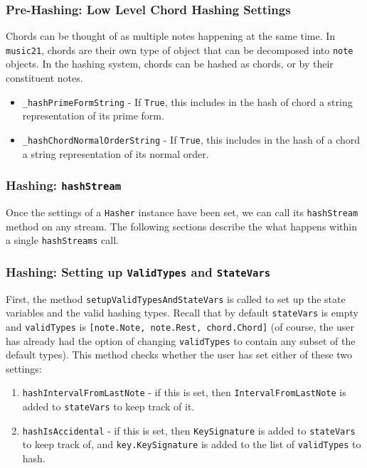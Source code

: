         \subsubsection{Pre-Hashing: Low Level Chord Hashing Settings}
        Chords can be thought of as multiple notes happening at the same time. In \texttt{music21}, chords are their own type of object that can be decomposed into \texttt{note} objects. In the hashing system, chords can be hashed as chords, or by their constituent notes.
                    \begin{itemize}
                    \item \texttt{\_hashPrimeFormString} - If \texttt{True}, this includes in the hash of chord a string representation of its prime form.
                    \item \texttt{\_hashChordNormalOrderString} - If \texttt{True}, this includes in the hash of a chord a string representation of its normal order. 
                    \end{itemize}
        \subsubsection{Hashing: \texttt{hashStream}}
        Once the settings of a \texttt{Hasher} instance have been set, we can call its \texttt{hashStream} method on any stream. The following sections describe the what happens within a single \texttt{hashStreams} call. 
        \subsubsection{Hashing: Setting up \texttt{ValidTypes} and \texttt{StateVars}}
        First, the method \texttt{setupValidTypesAndStateVars} is called to set up the state variables and the valid hashing types. Recall that by default \texttt{stateVars} is empty and \texttt{validTypes} is \texttt{[note.Note, note.Rest, chord.Chord]} (of course, the user has already had the option of changing \texttt{validTypes} to contain any subset of the default types). This method checks whether the user has set either of these two settings:
        \begin{enumerate}
        \item \texttt{hashIntervalFromLastNote} - if this is set, then \texttt{IntervalFromLastNote} is added to \texttt{stateVars} to keep track of it. 
        \item \texttt{hashIsAccidental} - if this is set, then \texttt{KeySignature} is added to \texttt{stateVars} to keep track of, and \texttt{key.KeySignature} is added to the list of \texttt{validTypes} to hash. 
        \end{enumerate}
        
